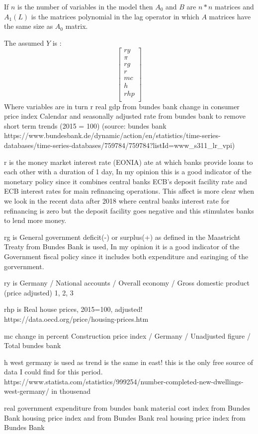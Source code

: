  If $n$  is the number of variables in the model then $A_0$ and $B$ are $n * n$ matrices and $A_1(L)$ is the matrices polynomial in the lag operator in which $A$ matrices have the same size as $A_0$ matrix.

The assumed $Y$ is :
\[ 
 \begin{bmatrix}
        ry \\ 
        \pi \\
        rg \\
        r \\
        mc \\
        h \\
        rhp \\
  \end{bmatrix}
\]
Where variables are in turn r
real gdp from bundes bank
 change in consumer price index Calendar and seasonally adjusted  rate from bundes bank to remove short term trends (2015 = 100)
(source: bundes bank https://www.bundesbank.de/dynamic/action/en/statistics/time-series-databases/time-series-databases/759784/759784?listId=www_s311_lr_vpi)

r is the money market interest rate (EONIA) ate at which banks provide loans to each other with a duration of 1 day, In my opinion this is a good indicator of the monetary policy since it combines central banks ECB's deposit facility rate and ECB interest rates for main refinancing operations. This affect is more clear when we look in the recent data after 2018 where central banks interest rate for refinancing is zero but the deposit facility goes negative and this stimulates banks to lend more money. 

rg is
General government deficit(-) or surplus(+) as defined in the Maastricht Treaty from  Bundes Bank is used, In my opinion it is a good indicator of the Government fiscal policy since it includes both expenditure and earinging of the gorvernment.

ry is
Germany / National accounts / Overall economy / Gross domestic product (price adjusted) 1, 2, 3

rhp is 
Real house prices, 2015=100, adjusted! https://data.oecd.org/price/housing-prices.htm

mc 
change in percent Construction price index / Germany / Unadjusted figure / Total  bundes bank

h
west germany is used as trend is the same in east! this is the only free source of data I could find for this period.
 https://www.statista.com/statistics/999254/number-completed-new-dwellings-west-germany/ in thousenad


 real government expenditure from bundes bank
 material cost index from Bundes Bank
 housing price index and from Bundes Bank
 real housing price index from Bundes Bank


